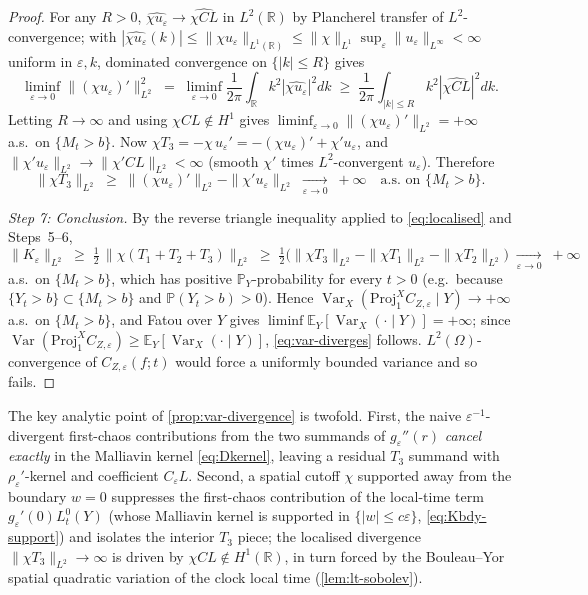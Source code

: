 \documentclass[11pt,reqno]{amsart}
\theoremstyle{plain}
\theoremstyle{definition}
\theoremstyle{remark}
\newcommand{\R}{\mathbb{R}}
\newcommand{\E}{\mathbb{E}}
\newcommand{\Prob}{\mathbb{P}}
\newcommand{\IBM}{Z}
\DeclareMathOperator{\Var}{Var}
\begin{document}
\begin{proof}
For any $R>0$, $\widehat{\chi u_\varepsilon}\to\widehat{\chi CL}$
in $L^{2}(\R)$ by Plancherel transfer of $L^{2}$-convergence; with
$|\widehat{\chi u_\varepsilon}(k)|\le\|\chi u_\varepsilon\|_{L^{1}(\R)}\le
\|\chi\|_{L^{1}}\sup_\varepsilon\|u_\varepsilon\|_{L^{\infty}}<\infty$
uniform in $\varepsilon,k$, dominated convergence on $\{|k|\le R\}$
gives
\[
  \liminf_{\varepsilon\to 0}\|(\chi u_\varepsilon)'\|_{L^{2}}^{2}
   \;=\;\liminf_{\varepsilon\to 0}\frac{1}{2\pi}\!\int_\R k^{2}|\widehat{\chi u_\varepsilon}|^{2}dk
   \;\ge\;\frac{1}{2\pi}\!\int_{|k|\le R}\!k^{2}|\widehat{\chi CL}|^{2}dk.
\]
Letting $R\to\infty$ and using $\chi CL\notin H^{1}$ gives
$\liminf_{\varepsilon\to 0}\|(\chi u_\varepsilon)'\|_{L^{2}}=+\infty$
a.s.\ on $\{M_t>b\}$. Now
$\chi T_3=-\chi\,u_\varepsilon'=-(\chi u_\varepsilon)'+\chi'u_\varepsilon$,
and $\|\chi'u_\varepsilon\|_{L^{2}}\to\|\chi'CL\|_{L^{2}}<\infty$
(smooth $\chi'$ times $L^{2}$-convergent $u_\varepsilon$). Therefore
\[
  \|\chi T_3\|_{L^{2}}\;\ge\;\|(\chi u_\varepsilon)'\|_{L^{2}}-\|\chi'u_\varepsilon\|_{L^{2}}\;\xrightarrow[\varepsilon\to 0]{}\;+\infty
  \quad\text{a.s.\ on }\{M_t>b\}.
\]

\emph{Step 7: Conclusion.}
By the reverse triangle inequality applied to \eqref{eq:localised}
and Steps~5--6,
\[
  \|K_\varepsilon\|_{L^{2}}
   \;\ge\;\tfrac12\,\|\chi(T_1+T_2+T_3)\|_{L^{2}}
   \;\ge\;\tfrac12\bigl(\|\chi T_3\|_{L^{2}}-\|\chi T_1\|_{L^{2}}-\|\chi T_2\|_{L^{2}}\bigr)
   \;\xrightarrow[\varepsilon\to 0]{}\;+\infty
\]
a.s.\ on $\{M_t>b\}$, which has positive $\Prob_Y$-probability for
every $t>0$ (e.g.\ because $\{Y_t>b\}\subset\{M_t>b\}$ and
$\Prob(Y_t>b)>0$). Hence
$\Var_X(\mathrm{Proj}_1^{X}C_{\IBM,\varepsilon}\mid Y)\to+\infty$
a.s.\ on $\{M_t>b\}$, and Fatou over $Y$ gives
$\liminf\E_Y[\Var_X(\cdot\mid Y)]=+\infty$; since
$\Var(\mathrm{Proj}_1^{X}C_{\IBM,\varepsilon})\ge\E_Y[\Var_X(\cdot\mid Y)]$,
\eqref{eq:var-diverges} follows. $L^{2}(\Omega)$-convergence of
$C_{\IBM,\varepsilon}(f;t)$ would force a uniformly bounded variance
and so fails.
\end{proof}

The key analytic point of \cref{prop:var-divergence} is twofold.
First, the naive $\varepsilon^{-1}$-divergent first-chaos
contributions from the two summands of $g_\varepsilon''(r)$
\emph{cancel exactly} in the Malliavin kernel \eqref{eq:Dkernel},
leaving a residual $T_3$ summand with $\rho_\varepsilon'$-kernel and
coefficient $C_\varepsilon L$. Second, a spatial cutoff $\chi$
supported away from the boundary $w=0$ suppresses the first-chaos
contribution of the local-time term $g_\varepsilon'(0)L_t^{0}(Y)$
(whose Malliavin kernel is supported in $\{|w|\le c\varepsilon\}$,
\eqref{eq:Kbdy-support}) and isolates the interior $T_3$ piece; the
localised divergence
$\|\chi T_3\|_{L^{2}}\to\infty$ is driven by
$\chi CL\notin H^{1}(\R)$, in turn forced by the Bouleau--Yor spatial
quadratic variation of the clock local time
(\cref{lem:lt-sobolev}).
\end{document}
